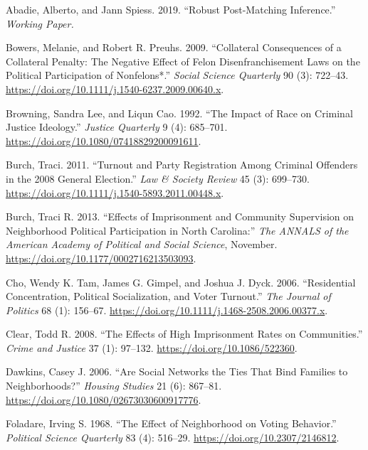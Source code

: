 \documentclass[
  12pt,
]{article}
\newlength{\cslhangindent}
\newenvironment{cslreferences}%
  {\setlength{\parindent}{0pt}%
  \everypar{\setlength{\hangindent}{\cslhangindent}}\ignorespaces}%
  {\par}
\begin{document}
\hypertarget{refs}{}
\begin{cslreferences}
\leavevmode\hypertarget{ref-Abadie2019}{}%
Abadie, Alberto, and Jann Spiess. 2019. ``Robust Post-Matching Inference.'' \emph{Working Paper.}

\leavevmode\hypertarget{ref-Bowers2009}{}%
Bowers, Melanie, and Robert R. Preuhs. 2009. ``Collateral Consequences of a Collateral Penalty: The Negative Effect of Felon Disenfranchisement Laws on the Political Participation of Nonfelons*.'' \emph{Social Science Quarterly} 90 (3): 722--43. \url{https://doi.org/10.1111/j.1540-6237.2009.00640.x}.

\leavevmode\hypertarget{ref-Browning1992}{}%
Browning, Sandra Lee, and Liqun Cao. 1992. ``The Impact of Race on Criminal Justice Ideology.'' \emph{Justice Quarterly} 9 (4): 685--701. \url{https://doi.org/10.1080/07418829200091611}.

\leavevmode\hypertarget{ref-Burch2011}{}%
Burch, Traci. 2011. ``Turnout and Party Registration Among Criminal Offenders in the 2008 General Election.'' \emph{Law \& Society Review} 45 (3): 699--730. \url{https://doi.org/10.1111/j.1540-5893.2011.00448.x}.

\leavevmode\hypertarget{ref-Burch2013}{}%
Burch, Traci R. 2013. ``Effects of Imprisonment and Community Supervision on Neighborhood Political Participation in North Carolina:'' \emph{The ANNALS of the American Academy of Political and Social Science}, November. \url{https://doi.org/10.1177/0002716213503093}.

\leavevmode\hypertarget{ref-Cho2006}{}%
Cho, Wendy K. Tam, James G. Gimpel, and Joshua J. Dyck. 2006. ``Residential Concentration, Political Socialization, and Voter Turnout.'' \emph{The Journal of Politics} 68 (1): 156--67. \url{https://doi.org/10.1111/j.1468-2508.2006.00377.x}.

\leavevmode\hypertarget{ref-Clear2008}{}%
Clear, Todd R. 2008. ``The Effects of High Imprisonment Rates on Communities.'' \emph{Crime and Justice} 37 (1): 97--132. \url{https://doi.org/10.1086/522360}.

\leavevmode\hypertarget{ref-Dawkins2006}{}%
Dawkins, Casey J. 2006. ``Are Social Networks the Ties That Bind Families to Neighborhoods?'' \emph{Housing Studies} 21 (6): 867--81. \url{https://doi.org/10.1080/02673030600917776}.

\leavevmode\hypertarget{ref-Foladare1968}{}%
Foladare, Irving S. 1968. ``The Effect of Neighborhood on Voting Behavior.'' \emph{Political Science Quarterly} 83 (4): 516--29. \url{https://doi.org/10.2307/2146812}.


\end{cslreferences}
\end{document}
